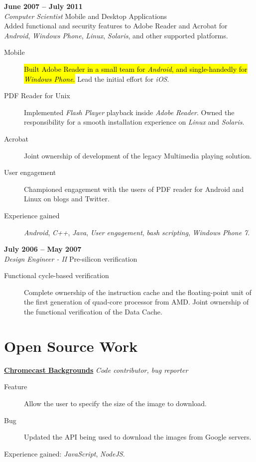 \documentclass[margin,line]{resume}
\begin{document}
\begin{resume}
	 \hfill \textbf{June 2007 -- July 2011}\\
	\textsl{Computer Scientist} \hfill Mobile and Desktop Applications\\
	Added functional and security features to Adobe Reader and Acrobat for \textit{Android}, \textit{Windows Phone}, \textit{Linux}, \textit{Solaris}, and other supported platforms.
	\begin{description}
	\item [Mobile] \hl{Built Adobe Reader in a small team for \textit{Android}, and single-handedly for \textit{Windows Phone}.} Lead the initial effort for \textit{iOS}.
	\item [PDF Reader for Unix] Implemented \textit{Flash Player} playback inside \textit{Adobe Reader}. Owned the responsibility for a smooth installation experience on \textit{Linux} and \textit{Solaris}.
	\item [Acrobat] Joint ownership of development of the legacy Multimedia playing solution.
	\item [User engagement] Championed engagement with the users of PDF reader for Android and Linux on blogs and Twitter.
	\item [Experience gained] \textit{Android}, \textit{C++}, \textit{Java}, \textit{User engagement}, \textit{bash scripting}, \textit{Windows Phone 7}.
    \end{description}

	 \hfill \textbf{July 2006 -- May 2007}\\
	\textsl{Design Engineer - II} \hfill Pre-silicon verification\\
	\begin{description}
	\item [Functional cycle-based verification] Complete ownership of the instruction cache and the floating-point unit of the first generation of quad-core processor from AMD. Joint ownership of the functional verification of the Data Cache.
    \end{description}
	\vfill \break

	\section{Open Source Work}

	\textbf{\href{https://github.com/aawc/Chromecast-Backgrounds}{Chromecast Backgrounds}} \hfill \textsl{Code contributor, bug reporter}\\
	\begin{description}
    \item[Feature] Allow the user to specify the size of the image to download.
    \item[Bug] Updated the API being used to download the images from Google servers.
    \end{description}
	Experience gained: \textit{JavaScript}, \textit{NodeJS}.


\end{resume}
\end{document}
